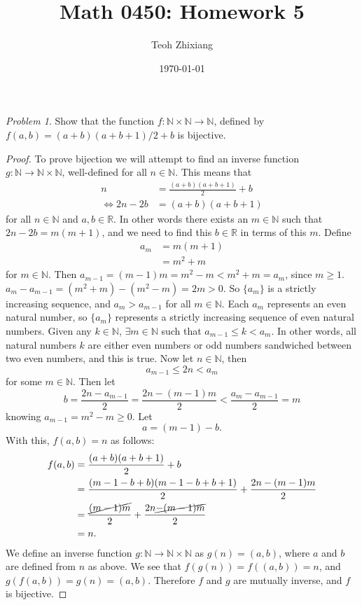 \documentclass[11pt,twoside, reqno]{amsart}
\theoremstyle{remark}
\newtheorem{Prob}{Problem}
\def\R{\mathbb R}
\def\N{\mathbb N}
\renewcommand{\iff}{\Leftrightarrow}
\begin{document}
\title{Math 0450: Homework 5}
\date{\today}
\author{Teoh Zhixiang}

\maketitle



\begin{Prob}
Show that the function $f:\N \times \N \to \N$, defined by $f(a,b)=(a+b)(a+b+1)/2+b$ is bijective. 

\end{Prob}

\begin{proof}
To prove bijection we will attempt to find an inverse function $g:\N \to \N \times \N$, well-defined for all $n \in \N$. This means that
\begin{align*}
n &= \frac{(a+b)(a+b+1)}{2} + b \\
\iff 2n - 2b &= (a+b)(a+b+1)
\end{align*}
for all $n \in \N$ and $a,b \in \R$. In other words there exists an $m \in \N$ such that $2n - 2b = m(m+1)$, and we need to find this $b \in \R$ in terms of this $m$.
Define 
\begin{align*}
   a_m & = m(m+1) \\
   & = m^2 + m
\end{align*}
for $m \in \N$. Then $a_{m-1} = (m-1)m = m^2 - m < m^2 + m = a_m$, since $m \geq 1$. $a_m - a_{m-1} = (m^2 + m) - (m^2 - m) = 2m > 0$. So $\{a_m\}$ is a strictly increasing sequence, and $a_m > a_{m-1}$ for all $m \in \N$. Each $a_m$ represents an even natural number, so $\{a_m\}$ represents a strictly increasing sequence of even natural numbers. Given any $k \in \N$, $\exists m \in \N$ such that $a_{m-1} \leq k < a_m$. In other words, all natural numbers $k$ are either even numbers or odd numbers sandwiched between two even numbers, and this is true. Now let $n \in \N$, then 
$$
a_{m-1} \leq 2n < a_m
$$
for some $m \in \N$. Then let
$$
b = \frac{2n-a_{m-1}}{2} = \frac{2n-(m-1)m}{2} < \frac{a_m-a_{m-1}}{2} = m
$$
knowing $a_{m-1} = m^2-m \geq 0$. Let 
$$
a = (m-1)-b.
$$
With this, $f(a,b) = n$ as follows:
\begin{align*}
f(a,b) &= \frac{(a+b)(a+b+1)}{2} + b \\
&= \frac{(m-1-b+b)(m-1-b+b+1)}{2} + \frac{2n-(m-1)m}{2} \\
&= \frac{\cancel{(m-1)m}}{2} + \frac{2n\cancel{-(m-1)m}}{2} \\
&= n.
\end{align*}
We define an inverse function $g:\N \to \N \times \N$ as $g(n) = (a,b)$, where $a$ and $b$ are defined from $n$ as above. We see that $f(g(n)) = f((a,b)) = n$, and $g(f(a,b)) = g(n) = (a,b)$. Therefore $f$ and $g$ are mutually inverse, and $f$ is bijective.
\end{proof}
\end{document}
